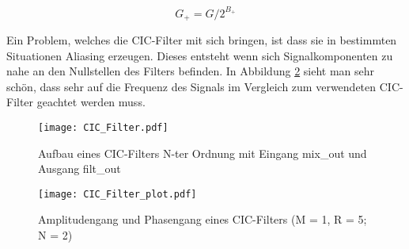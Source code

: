 \begin{equation}
G_+ = G/2^{B_+}
\label{equ:cic_gain+}
\end{equation}

Ein Problem, welches die CIC-Filter mit sich bringen, ist dass sie in bestimmten Situationen Aliasing erzeugen. Dieses entsteht wenn sich Signalkomponenten zu nahe an den Nullstellen des Filters befinden. In Abbildung \ref{img:CIC_Filter_plot} sieht man sehr schön, dass sehr auf die Frequenz des Signals im Vergleich zum verwendeten CIC-Filter geachtet werden muss.


\begin{figure}[h]
	\centering
	\texttt{[image: CIC\_Filter.pdf]}
	\caption{Aufbau eines CIC-Filters N-ter Ordnung mit Eingang mix\_out und Ausgang filt\_out}
	\label{img:CIC_Filter}
\end{figure}

\begin{figure}[h]
	\centering
	\texttt{[image: CIC\_Filter\_plot.pdf]}
	\caption{Amplitudengang und Phasengang eines CIC-Filters (M = 1, R = 5; N = 2)}
	\label{img:CIC_Filter_plot}
\end{figure}